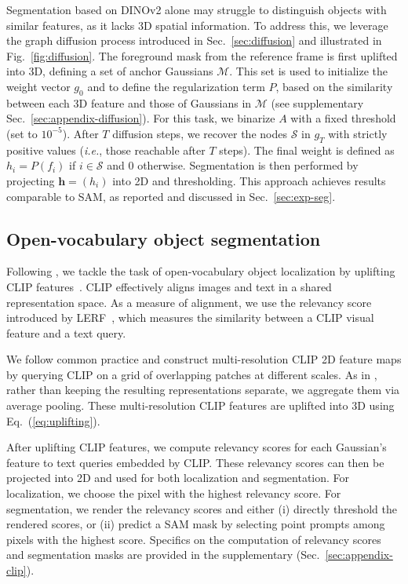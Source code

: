 Segmentation based on DINOv2 alone may struggle to distinguish objects with similar features, as it lacks 3D spatial information.
To address this, we leverage the graph diffusion process introduced in Sec.~\ref{sec:diffusion} and illustrated in Fig.~\ref{fig:diffusion}. 
The foreground mask from the reference frame is first uplifted into 3D, defining a set of anchor Gaussians $\mathcal{M}$. This set is used to initialize the weight vector $g_0$ and to define the regularization term $P$, based on the similarity between each 3D feature and those of Gaussians in $\mathcal{M}$ (see supplementary Sec.~\ref{sec:appendix-diffusion}).
For this task, we binarize $A$ with a fixed threshold (set to $10^{-5}$). After $T$ diffusion steps, we recover the  nodes $\mathcal{S}$ in $g_T$ with strictly positive values (\emph{i.e.}, those reachable after $T$ steps). The final weight is defined as $h_i = P(f_i)$ if $i\in \mathcal{S}$ and $0$ otherwise. Segmentation is then performed by projecting $\mathbf{h} = (h_i)$ into 2D and thresholding.
This approach achieves results comparable to SAM, as reported and discussed in Sec.~\ref{sec:exp-seg}.

\subsection{Open-vocabulary object segmentation}
\label{sec:method_clip}

Following \cite{kerr2023lerf}, we tackle the task of open-vocabulary object localization by uplifting CLIP features~\citep{ilharco2021openclip}.
CLIP effectively aligns images and text in a shared representation space. As a measure of alignment, we use the relevancy score introduced by LERF~\citep{kerr2023lerf}, which measures the similarity between a CLIP visual feature and a text query.

We follow common practice \citep{kerr2023lerf, zuo2024fmgs} and construct multi-resolution CLIP 2D feature maps by querying CLIP on a grid of overlapping patches at different scales. 
As in \cite{zuo2024fmgs}, rather than keeping the resulting representations separate, we aggregate them via average pooling. These multi-resolution CLIP features are uplifted into 3D using Eq.~(\ref{eq:uplifting}).

After uplifting CLIP features, we compute relevancy scores for each Gaussian's feature to text queries embedded by CLIP. These relevancy scores can then be projected into 2D and used for both localization and segmentation. For localization, we choose the pixel with the highest relevancy score.
For segmentation, we render the relevancy scores and either (i) directly threshold the rendered scores, or (ii) predict a SAM mask by selecting point prompts among pixels with the highest score. Specifics on the computation of relevancy scores and segmentation masks are provided in the supplementary (Sec.~\ref{sec:appendix-clip}).

